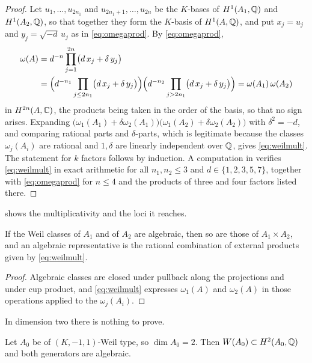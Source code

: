 \begin{proof}
Let $u_{1},\dots,u_{2n_{1}}$ and $u_{2n_{1}+1},\dots,u_{2n}$ be the
$K$-bases of $H^{1}(A_{1},\mathbb{Q})$ and $H^{1}(A_{2},\mathbb{Q})$, so that together they
form the $K$-basis of $H^{1}(A,\mathbb{Q})$, and put $x_{j}=u_{j}$ and
$y_{j}=\sqrt{-d}\,u_{j}$ as in \eqref{eq:omegaprod}. By \eqref{eq:omegaprod},
\[
\begin{aligned}
  \omega(A)
  &=d^{-n}\prod_{j=1}^{2n}\bigl(d\,x_{j}+\delta\,y_{j}\bigr)\\
  &=\Bigl(d^{-n_{1}}\prod_{j\le2n_{1}}\bigl(d\,x_{j}+\delta\,y_{j}\bigr)\Bigr)
   \Bigl(d^{-n_{2}}\prod_{j>2n_{1}}\bigl(d\,x_{j}+\delta\,y_{j}\bigr)\Bigr)
  =\omega(A_{1})\,\omega(A_{2})
\end{aligned}
\]
in $H^{2n}(A,\mathbb{C})$, the products being taken in the order of the basis, so
that no sign arises. Expanding
$\bigl(\omega_{1}(A_{1})+\delta\omega_{2}(A_{1})\bigr)
\bigl(\omega_{1}(A_{2})+\delta\omega_{2}(A_{2})\bigr)$ with $\delta^{2}=-d$,
and comparing rational parts and $\delta$-parts, which is legitimate because
the classes $\omega_{j}(A_{i})$ are rational and $1,\delta$ are linearly
independent over $\mathbb{Q}$, gives \eqref{eq:weilmult}. The statement for $k$
factors follows by induction. A computation in \cite{BMB26} verifies
\eqref{eq:weilmult} in exact arithmetic for all $n_{1},n_{2}\le3$ and
$d\in\{1,2,3,5,7\}$, together with \eqref{eq:omegaprod} for $n\le4$ and the
products of three and four factors listed there.
\end{proof}

 shows the multiplicativity and the loci it reaches.

\begin{corollary}\label{cor:prodalg}
If the Weil classes of $A_{1}$ and of $A_{2}$ are algebraic, then so are those
of $A_{1}\times A_{2}$, and an algebraic representative is the rational
combination of external products given by \eqref{eq:weilmult}.
\end{corollary}

\begin{proof}
Algebraic classes are closed under pullback along the projections and under
cup product, and \eqref{eq:weilmult} expresses $\omega_{1}(A)$ and
$\omega_{2}(A)$ in those operations applied to the $\omega_{j}(A_{i})$.
\end{proof}

In dimension two there is nothing to prove.

\begin{lemma}\label{lem:basecase}
Let $A_{0}$ be of $(K,-1,1)$-Weil type, so $\dim A_{0}=2$. Then
$W(A_{0})\subset H^{2}(A_{0},\mathbb{Q})$ and both generators are algebraic.
\end{lemma}

